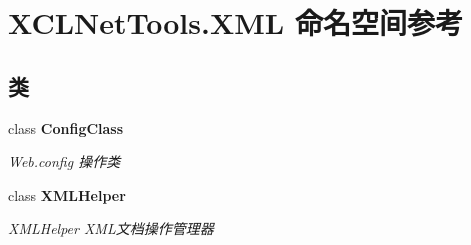 \hypertarget{namespace_x_c_l_net_tools_1_1_x_m_l}{}\section{X\+C\+L\+Net\+Tools.\+X\+ML 命名空间参考}
\label{namespace_x_c_l_net_tools_1_1_x_m_l}
\subsection*{类}
\begin{DoxyCompactItemize}
\item 
class {\bfseries Config\+Class}
\begin{DoxyCompactList}\small\item\em Web.\+config 操作类 \end{DoxyCompactList}\item 
class {\bfseries X\+M\+L\+Helper}
\begin{DoxyCompactList}\small\item\em X\+M\+L\+Helper X\+M\+L文档操作管理器 \end{DoxyCompactList}\end{DoxyCompactItemize}
